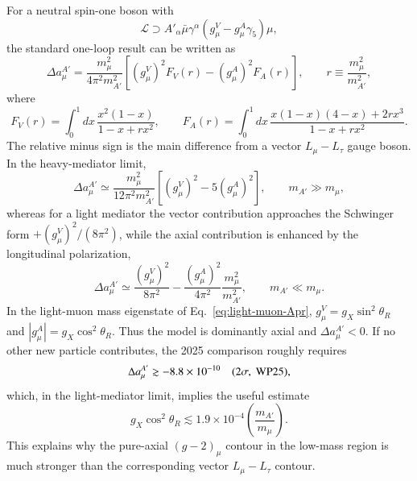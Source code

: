 \documentclass[onecolumn, aps, nofootinbib, prd, preprint, floats, floatfix, amsmath, amssymb, superscriptaddress, preprintnumbers]{revtex4-1}
\begin{document}
For a neutral spin-one boson with
\begin{equation}
\mathcal L\supset
A'_\alpha\bar\mu\gamma^\alpha
\left(g_\mu^V-g_\mu^A\gamma_5\right)\mu ,
\end{equation}
the standard one-loop result can be written as~\cite{Leveille:1977rc,Davoudiasl:2014kua,Anastasopoulos:2022ywj}
\begin{equation}
\Delta a_\mu^{A'}=
\frac{m_\mu^2}{4\pi^2m_{A'}^2}
\left[
(g_\mu^V)^2F_V(r)
-(g_\mu^A)^2F_A(r)
\right],
\qquad
r\equiv \frac{m_\mu^2}{m_{A'}^2},
\label{eq:gminus2-vector-axial}
\end{equation}
where
\begin{equation}
F_V(r)=\int_0^1 dx\,
\frac{x^2(1-x)}{1-x+r x^2},
\qquad
F_A(r)=\int_0^1 dx\,
\frac{x(1-x)(4-x)+2r x^3}{1-x+r x^2}.
\label{eq:gminus2-FV-FA}
\end{equation}
The relative minus sign is the main difference from a vector \(L_\mu-L_\tau\) gauge boson. In the heavy-mediator limit,
\begin{equation}
\Delta a_\mu^{A'}\simeq
\frac{m_\mu^2}{12\pi^2m_{A'}^2}
\left[(g_\mu^V)^2-5(g_\mu^A)^2\right],
\qquad m_{A'}\gg m_\mu ,
\label{eq:gminus2-heavy-limit}
\end{equation}
whereas for a light mediator the vector contribution approaches the Schwinger form \(+(g_\mu^V)^2/(8\pi^2)\), while the axial contribution is enhanced by the longitudinal polarization,
\begin{equation}
\Delta a_\mu^{A'}\simeq
\frac{(g_\mu^V)^2}{8\pi^2}
-\frac{(g_\mu^A)^2}{4\pi^2}\frac{m_\mu^2}{m_{A'}^2},
\qquad m_{A'}\ll m_\mu .
\label{eq:gminus2-light-limit}
\end{equation}
In the light-muon mass eigenstate of Eq.~\eqref{eq:light-muon-Apr}, \(g_\mu^V=g_X\sin^2\theta_R\) and \(|g_\mu^A|=g_X\cos^2\theta_R\). Thus the model is dominantly axial and \(\Delta a_\mu^{A'}<0\). If no other new particle contributes, the 2025 comparison roughly requires
\begin{equation}
\Delta a_\mu^{A'} \gtrsim -8.8\times10^{-10}
\quad (2\sigma,\ {\rm WP25}),
\label{eq:gminus2-rough-bound}
\end{equation}
which, in the light-mediator limit, implies the useful estimate
\begin{equation}
g_X\cos^2\theta_R
\lesssim
1.9\times10^{-4}
\left(\frac{m_{A'}}{m_\mu}\right).
\label{eq:gminus2-light-bound}
\end{equation}
This explains why the pure-axial \((g-2)_\mu\) contour in the low-mass region is much stronger than the corresponding vector \(L_\mu-L_\tau\) contour.
\end{document}

